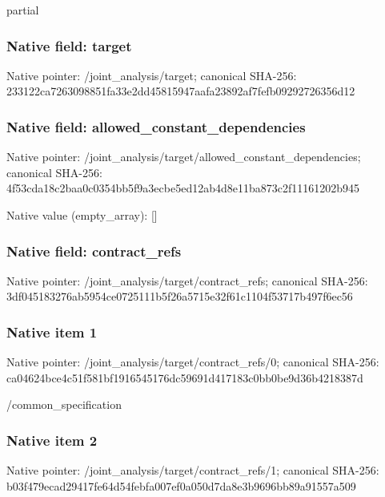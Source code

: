 \documentclass[10pt,a4paper]{article}
\begin{document}
\begingroup\raggedright\sloppy partial\par\endgroup

\subsubsection{Native field: target}
Native pointer: /joint\_\allowbreak{}analysis/target; canonical SHA-256: 233122ca7263098851fa33e2dd45815947aafa23892af7fefb09292726356d12

\subsubsection{Native field: allowed\_\allowbreak{}constant\_\allowbreak{}dependencies}
Native pointer: /joint\_\allowbreak{}analysis/target/allowed\_\allowbreak{}constant\_\allowbreak{}dependencies; canonical SHA-256: 4f53cda18c2baa0c0354bb5f9a3ecbe5ed12ab4d8e11ba873c2f11161202b945

Native value (empty\_\allowbreak{}array): []

\subsubsection{Native field: contract\_\allowbreak{}refs}
Native pointer: /joint\_\allowbreak{}analysis/target/contract\_\allowbreak{}refs; canonical SHA-256: 3df045183276ab5954ce0725111b5f26a5715e32f61c1104f53717b497f6ec56

\subsubsection{Native item 1}
Native pointer: /joint\_\allowbreak{}analysis/target/contract\_\allowbreak{}refs/0; canonical SHA-256: ca04624bce4c51f581bf1916545176dc59691d417183c0bb0be9d36b4218387d

\begingroup\raggedright\sloppy /\allowbreak{}common\_\allowbreak{}specification\par\endgroup

\subsubsection{Native item 2}
Native pointer: /joint\_\allowbreak{}analysis/target/contract\_\allowbreak{}refs/1; canonical SHA-256: b03f479ecad29417fe64d54febfa007ef0a050d7da8e3b9696bb89a91557a509
\end{document}

